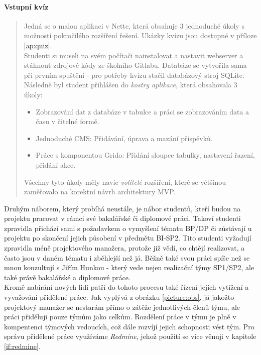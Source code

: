 \paragraph{Vstupní kvíz} \label{DBSmanagement:quiz}
\begin{quote}
Jedná se o malou aplikaci v Nette, která obsahuje 3 jednoduché úkoly s možností pokročilého rozšíření řešení. Ukázky kvízu jsou dostupné v příloze \ref{ap:quiz}.\\
Studenti si museli na svém počítači nainstalovat a nastavit webserver a stáhnout zdrojové kódy ze školního Gitlabu. Databáze se vytvořila sama při prvním spuštění - pro potřeby kvízu stačil databázový stroj SQLite. Následně byl student přihlášen do \emph{kostry aplikace}, která obsahovala 3 úkoly:
\begin{itemize}
	\item Zobrazování dat z databáze v tabulce a práci se zobrazováním data a času v čitelné formě.
	\item Jednoduché CMS: Přidávání, úprava a mazání příspěvků.
	\item Práce s komponentou Grido: Přidání sloupce tabulky, nastavení řazení, přidání akce.
\end{itemize}
Všechny tyto úkoly měly navíc \emph{volitelé} rozšíření, které se většinou zaměřovalo na korektní návrh architektury MVP. 
\end{quote}

Druhým náborem, který probíhá neustále, je nábor studentů, kteří budou na projektu pracovat v rámci své bakalářské či diplomové práci. Takoví studenti zpravidla přichází sami s požadavkem o vymyšlení tématu BP/DP či zůstávají u projektu po skončení jejich působení v předmětu BI-SP2. Tito studenti vyžadují zpravidla méně  projektového manažera, protože již vědí, co chtějí realizovat, a často jsou v daném tématu i zběhlejší než já. Běžně také svou práci spíše než se mnou konzultují s Jiřím Hunkou - který vede nejen realizační týmy SP1/SP2, ale také právě bakalářské a diplomové práce.\\

Kromě nabírání nových lidí patří do tohoto procesu také řízení jejich vytížení a vyvažování přidělené práce. Jak vyplývá z obrázku \ref{picture:obs}, já jakožto projektový manažer se nestarám přímo o zátěže jednotlivých členů týmu, ale práci přiděluji pouze týmům jako celkům. Rozdělení práce v týmu je plně v kompentenci týmových vedoucích, což dále rozvíjí jejich schopnosti vést tým. Pro správu přidělené práce využíváme \emph{Redmine}, jehož použití se více věnuji v kapitole \ref{if:redmine}.

